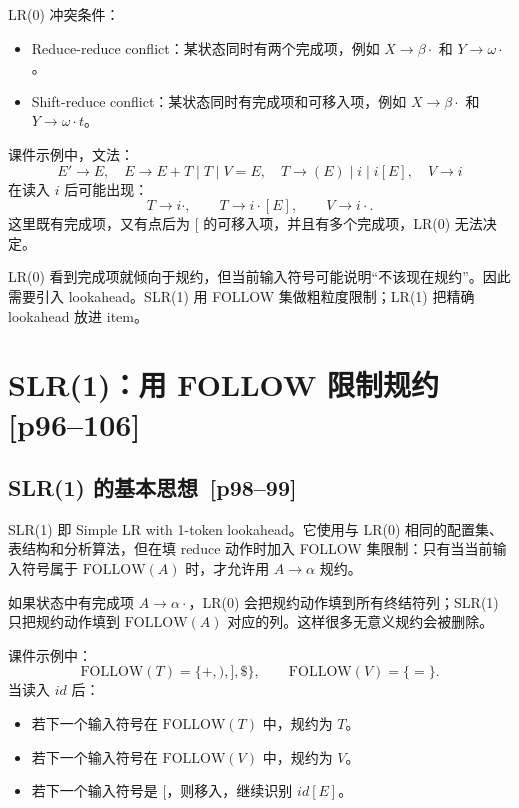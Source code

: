 \documentclass[UTF8,fontset=none,11pt]{ctexart}
\newenvironment{defbox}[1][]{%
  \par\medskip\noindent{\color{defrule}\rule{\linewidth}{1.1pt}}\par\nopagebreak
  \noindent{\bfseries\color{defrule}#1}\par\nopagebreak\smallskip}%
  {\par\nopagebreak\smallskip\noindent{\color{defrule}\rule{\linewidth}{0.4pt}}\par\medskip}
\newenvironment{warnbox}[1][]{%
  \par\medskip\noindent{\color{warnrule}\rule{\linewidth}{1.1pt}}\par\nopagebreak
  \noindent{\bfseries\color{warnrule}#1}\par\nopagebreak\smallskip}%
  {\par\nopagebreak\smallskip\noindent{\color{warnrule}\rule{\linewidth}{0.4pt}}\par\medskip}
\newcommand{\pg}[1]{\texorpdfstring{{\small\color{graytext}\,[p#1]}}{ [p#1]}}
\newcommand{\FOLLOW}{\ensuremath{\mathrm{FOLLOW}}}
\begin{document}
LR(0) 冲突条件：

\begin{itemize}
  \item Reduce-reduce conflict：某状态同时有两个完成项，例如 \(X\to\beta\cdot\) 和 \(Y\to\omega\cdot\)。
  \item Shift-reduce conflict：某状态同时有完成项和可移入项，例如 \(X\to\beta\cdot\) 和 \(Y\to\omega\cdot t\)。
\end{itemize}

课件示例中，文法：
\[
E'\to E,\quad
E\to E+T\mid T\mid V=E,\quad
T\to (E)\mid i\mid i[E],\quad
V\to i
\]
在读入 \(i\) 后可能出现：
\[
T\to i\cdot,\qquad T\to i\cdot [E],\qquad V\to i\cdot.
\]
这里既有完成项，又有点后为 \([ \) 的可移入项，并且有多个完成项，LR(0) 无法决定。

\begin{warnbox}[LR(0) 的根本局限]
LR(0) 看到完成项就倾向于规约，但当前输入符号可能说明“不该现在规约”。因此需要引入 lookahead。SLR(1) 用 FOLLOW 集做粗粒度限制；LR(1) 把精确 lookahead 放进 item。
\end{warnbox}

\section{SLR(1)：用 FOLLOW 限制规约 \pg{96--106}}

\subsection{SLR(1) 的基本思想 \pg{98--99}}

\begin{defbox}[SLR(1)]
SLR(1) 即 Simple LR with 1-token lookahead。它使用与 LR(0) 相同的配置集、表结构和分析算法，但在填 reduce 动作时加入 FOLLOW 集限制：只有当当前输入符号属于 \(\FOLLOW(A)\) 时，才允许用 \(A\to\alpha\) 规约。
\end{defbox}

如果状态中有完成项 \(A\to\alpha\cdot\)，LR(0) 会把规约动作填到所有终结符列；SLR(1) 只把规约动作填到 \(\FOLLOW(A)\) 对应的列。这样很多无意义规约会被删除。

课件示例中：
\[
\FOLLOW(T)=\{+,),],\$\},\qquad \FOLLOW(V)=\{=\}.
\]
当读入 \(id\) 后：

\begin{itemize}
  \item 若下一个输入符号在 \(\FOLLOW(T)\) 中，规约为 \(T\)。
  \item 若下一个输入符号在 \(\FOLLOW(V)\) 中，规约为 \(V\)。
  \item 若下一个输入符号是 \([ \)，则移入，继续识别 \(id[E]\)。
\end{itemize}
\end{document}
